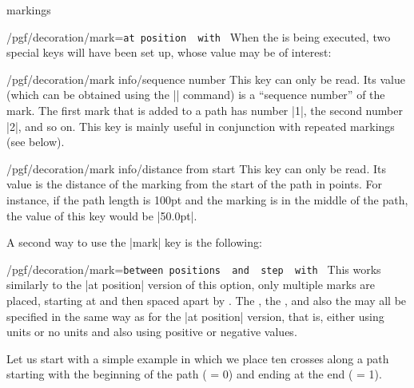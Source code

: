 \begin{decoration}{markings}
\begin{key}{/pgf/decoration/mark=\texttt{at position }\texttt{ with }}
        When the  is being executed, two special keys will have been
        set up, whose value may be of interest:
        \begin{key}{/pgf/decoration/mark info/sequence number}
            This key can only be read. Its value (which can be obtained using
            the |\pgfkeysvalueof| command) is a ``sequence number'' of the
            mark. The first mark that is added to a path has number |1|, the
            second number |2|, and so on. This key is mainly useful in
            conjunction with repeated markings (see below).
        \end{key}
        \begin{key}{/pgf/decoration/mark info/distance from start}
            This key can only be read. Its value is the distance of the marking
            from the start of the path in points. For instance, if the path
            length is 100pt and the marking is in the middle of the path, the
            value of this key would be |50.0pt|.
        \end{key}
    \end{key}

    A second way to use the |mark| key is the following:
    \begin{key}{/pgf/decoration/mark=\texttt{between positions }\texttt{ and }\texttt{ step }\texttt{ with }}
        This works similarly to the |at position| version of this option, only
        multiple marks are placed, starting at  and then spaced
        apart by . The , the , and
        also the  may all be specified in the same way as for
        the |at position| version, that is, either using units or no units and
        also using positive or negative values.

        Let us start with a simple example in which we place ten crosses along
        a path starting with the beginning of the path ( = 0)
        and ending at the end ( = 1).
\begin{codeexample}[preamble={\usetikzlibrary{decorations.markings}}]
\end{codeexample}


\end{key}
\end{decoration}
